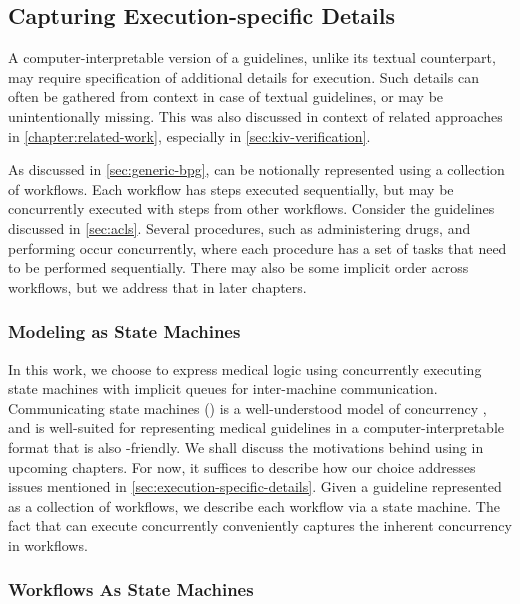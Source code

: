 \subsection{Capturing Execution-specific Details}\label{sec:execution-specific-details}

A computer-interpretable version of a guidelines, unlike its
textual counterpart, may require specification of additional details
for execution. Such details can often be gathered from context in case
of textual guidelines, or may be unintentionally missing. This was also
discussed in context of related approaches in \autoref{chapter:related-work},
especially in \autoref{sec:kiv-verification}.

As discussed in \autoref{sec:generic-bpg}, \BPGs{} can be notionally
represented using a collection of workflows. Each workflow has steps
executed sequentially, but may be concurrently executed with steps from
other workflows. Consider the \ACLS{} guidelines discussed in
\autoref{sec:acls}. Several procedures, such as administering drugs,
and performing \CPR{} occur concurrently, where each procedure has
a set of tasks that need to be performed sequentially.
There may also be some implicit order across workflows, but we
address that in later chapters.

\subsubsection{Modeling \BPGs{} as State Machines}

In this work, we choose to express medical logic using
concurrently executing state machines with implicit queues for inter-machine communication.
Communicating state machines (\CSMs{}) is a well-understood model of concurrency
\cite{BrandJACM83}, and is well-suited for representing medical guidelines in a
computer-interpretable format that is also \HCP{}-friendly.
We shall discuss the motivations behind using \CSMs{} in upcoming
chapters. For now, it suffices to describe how our choice addresses
issues mentioned in \autoref{sec:execution-specific-details}.
Given a guideline represented as a collection of workflows, we
describe each workflow via a state machine. The fact that
\CSMs{} can execute concurrently conveniently captures the
inherent concurrency in workflows.

\subsubsection{\ACLS{} Workflows As State Machines}

